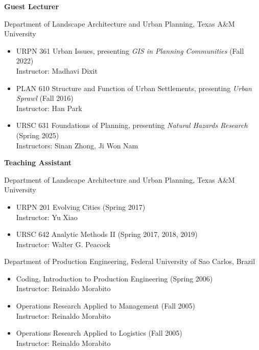 \documentclass[11pt,oneside]{article}
\begin{document}
\newpage
\pagestyle{main}

\textbf{Guest Lecturer}

\vspace{3pt}

{Department of Landscape Architecture and Urban Planning, Texas A\&M University}
\begin{itemize}[leftmargin=20pt]
\item URPN 361 Urban Issues, presenting \emph{GIS in Planning Communities} (Fall 2022)\\
      Instructor: Madhavi Dixit
\item PLAN 610 Structure and Function of Urban Settlements, presenting \emph{Urban Sprawl} (Fall 2016)\\
      Instructor: Han Park
\item URSC 631 Foundations of Planning, presenting \emph{Natural Hazards Research} (Spring 2025)\\
      Instructors: Sinan Zhong, Ji Won Nam
\end{itemize}

\vspace{3pt}

\textbf{Teaching Assistant}

\vspace{3pt}

{Department of Landscape Architecture and Urban Planning, Texas A\&M University}
\begin{itemize}[leftmargin=20pt]
\item URPN 201 Evolving Cities (Spring 2017)\\
      Instructor: Yu Xiao
\item URSC 642 Analytic Methods II (Spring 2017, 2018, 2019)\\
      Instructor: Walter G. Peacock
\end{itemize}

\vspace{3pt}

{Department of Production Engineering, Federal University of Sao Carlos, Brazil}
\begin{itemize}[leftmargin=20pt]
\item Coding, Introduction to Production Engineering (Spring 2006)\\
      Instructor: Reinaldo Morabito
\item Operations Research Applied to Management (Fall 2005)\\
      Instructor: Reinaldo Morabito
\item Operations Research Applied to Logistics (Fall 2005)\\
      Instructor: Reinaldo Morabito
\end{itemize}
\end{document}
